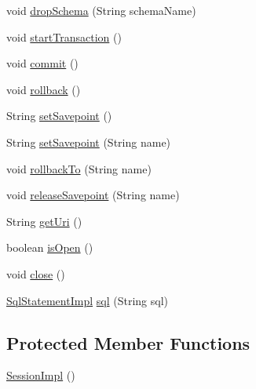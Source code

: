 \begin{DoxyCompactItemize}
\item 
void \mbox{\hyperlink{classcom_1_1mysql_1_1cj_1_1xdevapi_1_1_session_impl_acc48589d267536ca687a05dfb315415c}{drop\+Schema}} (String schema\+Name)
\item 
void \mbox{\hyperlink{classcom_1_1mysql_1_1cj_1_1xdevapi_1_1_session_impl_a765f8d81a34ca32d608bdeb5e56e3119}{start\+Transaction}} ()
\item 
void \mbox{\hyperlink{classcom_1_1mysql_1_1cj_1_1xdevapi_1_1_session_impl_a63bd825fc3c1d7b27cd7294bef2c8a65}{commit}} ()
\item 
void \mbox{\hyperlink{classcom_1_1mysql_1_1cj_1_1xdevapi_1_1_session_impl_a7c11c5d1f54f7a1f6ad2c0891dd59a67}{rollback}} ()
\item 
String \mbox{\hyperlink{classcom_1_1mysql_1_1cj_1_1xdevapi_1_1_session_impl_a3eb7fd3b8ff1e2fc436fc271f1129fae}{set\+Savepoint}} ()
\item 
String \mbox{\hyperlink{classcom_1_1mysql_1_1cj_1_1xdevapi_1_1_session_impl_a4425c6c14d6b1159a23c0ede2b2e120d}{set\+Savepoint}} (String name)
\item 
void \mbox{\hyperlink{classcom_1_1mysql_1_1cj_1_1xdevapi_1_1_session_impl_adcd0910556c2529fe20a6fa85c96a88d}{rollback\+To}} (String name)
\item 
void \mbox{\hyperlink{classcom_1_1mysql_1_1cj_1_1xdevapi_1_1_session_impl_a8bf42a1928a6bb71f3047e072b9210b4}{release\+Savepoint}} (String name)
\item 
String \mbox{\hyperlink{classcom_1_1mysql_1_1cj_1_1xdevapi_1_1_session_impl_af181caf1c47641912a47ef9445a9ddca}{get\+Uri}} ()
\item 
boolean \mbox{\hyperlink{classcom_1_1mysql_1_1cj_1_1xdevapi_1_1_session_impl_a0b6cff692d4e7882a546118b25820978}{is\+Open}} ()
\item 
void \mbox{\hyperlink{classcom_1_1mysql_1_1cj_1_1xdevapi_1_1_session_impl_a84c222e009725cc3984f4edd56effec8}{close}} ()
\item 
\mbox{\hyperlink{classcom_1_1mysql_1_1cj_1_1xdevapi_1_1_sql_statement_impl}{Sql\+Statement\+Impl}} \mbox{\hyperlink{classcom_1_1mysql_1_1cj_1_1xdevapi_1_1_session_impl_a28b412626c5f92aa146ede32d4e8033d}{sql}} (String sql)
\end{DoxyCompactItemize}
\subsection*{Protected Member Functions}
\begin{DoxyCompactItemize}
\item 
\mbox{\hyperlink{classcom_1_1mysql_1_1cj_1_1xdevapi_1_1_session_impl_aafbc9f570d539e57379332bb227257b0}{Session\+Impl}} ()
\end{DoxyCompactItemize}
